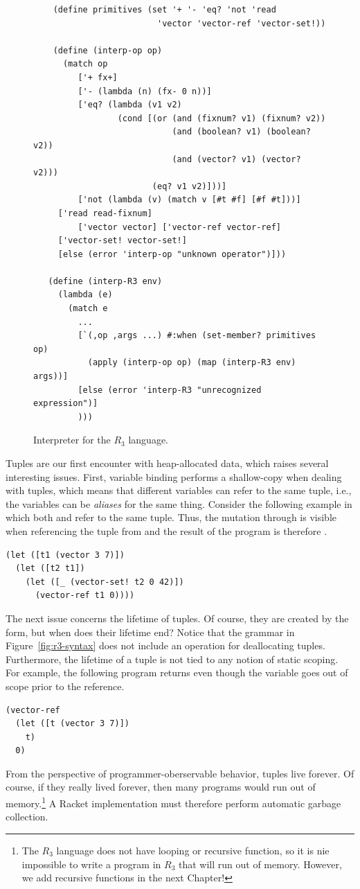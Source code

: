 \documentclass[11pt]{book}
\begin{document}
\begin{figure}[tbp]
\begin{lstlisting}
    (define primitives (set '+ '- 'eq? 'not 'read 
                         'vector 'vector-ref 'vector-set!))

    (define (interp-op op)
      (match op
         ['+ fx+]
         ['- (lambda (n) (fx- 0 n))]
         ['eq? (lambda (v1 v2)
                 (cond [(or (and (fixnum? v1) (fixnum? v2))
                            (and (boolean? v1) (boolean? v2))
                            (and (vector? v1) (vector? v2)))
                        (eq? v1 v2)]))]
         ['not (lambda (v) (match v [#t #f] [#f #t]))]
	 ['read read-fixnum]
         ['vector vector] ['vector-ref vector-ref]
	 ['vector-set! vector-set!]
	 [else (error 'interp-op "unknown operator")]))

   (define (interp-R3 env)
     (lambda (e)
       (match e
         ...
         [`(,op ,args ...) #:when (set-member? primitives op)
           (apply (interp-op op) (map (interp-R3 env) args))]
         [else (error 'interp-R3 "unrecognized expression")]
         )))
\end{lstlisting}
\caption{Interpreter for the $R_3$ language.}
\label{fig:interp-R3}
\end{figure}

Tuples are our first encounter with heap-allocated data, which raises
several interesting issues. First, variable binding performs a
shallow-copy when dealing with tuples, which means that different
variables can refer to the same tuple, i.e., the variables can be
\emph{aliases} for the same thing. Consider the following example in
which both  and  refer to the same tuple.  Thus, the
mutation through  is visible when referencing the tuple from
 and the result of the program is therefore .
\begin{lstlisting}
(let ([t1 (vector 3 7)])
  (let ([t2 t1])
    (let ([_ (vector-set! t2 0 42)])
      (vector-ref t1 0))))
\end{lstlisting}

The next issue concerns the lifetime of tuples. Of course, they are
created by the  form, but when does their lifetime end?
Notice that the grammar in Figure~\ref{fig:r3-syntax} does not include
an operation for deallocating tuples. Furthermore, the lifetime of a
tuple is not tied to any notion of static scoping. For example, the
following program returns  even though the variable 
goes out of scope prior to the reference.
\begin{lstlisting}
(vector-ref
  (let ([t (vector 3 7)])
    t)
  0)
\end{lstlisting}
From the perspective of programmer-oberservable behavior, tuples live
forever. Of course, if they really lived forever, then many programs
would run out of memory.\footnote{The $R_3$ language does not have
  looping or recursive function, so it is nie impossible to write a
  program in $R_3$ that will run out of memory. However, we add
  recursive functions in the next Chapter!} A Racket implementation
must therefore perform automatic garbage collection.
\end{document}
